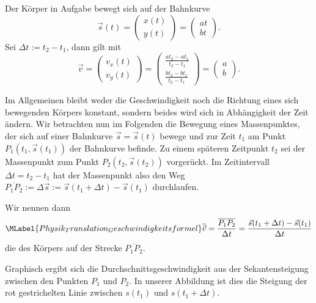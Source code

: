 \begin{MContent}
\begin{MExercise}
 \begin{MSolution} Der K\"orper in Aufgabe  bewegt sich auf der Bahnkurve
 $$
 \vec{s}(t)= \left(\begin{array}{c} x(t) \\ y(t) \end{array}\right)=\left(\begin{array}{c} a t \\ b t \end{array}\right).
 $$Sei $\Delta t:=t_2-t_1$, dann gilt mit 
 $$
 \vec{v}= \left(\begin{array}{c} v_x(t) \\ v_y(t) \end{array}\right)= \left(\begin{array}{c} \frac{a t_2-a t_1}{t_2-t_1} \\ \frac{b t_2-b t_1}{t_2-t_1} \end{array}\right)=\left(\begin{array}{c} a \\ b \end{array}\right).
 $$
 \end{MSolution}
 \end{MExercise}

 
 
 Im Allgemeinen bleibt weder die Geschwindigkeit noch die Richtung eines sich bewegenden K\"orpers konstant, sondern beides wird sich in Abh\"angigkeit der Zeit \"andern. Wir betrachten nun im Folgenden die Bewegung eines Massenpunktes, der sich auf einer Bahnkurve $\vec{s}=\vec{s}(t)$ bewege und zur Zeit $t_1$ am Punkt $P_1(t_1,\vec{s}(t_1))$ der Bahnkurve befinde. Zu einem sp\"ateren Zeitpunkt $t_2$ sei der Massenpunkt zum Punkt $P_2(t_2,\vec{s}(t_2))$ vorger\"uckt. Im Zeitintervall $\Delta t=t_2-t_1$ hat der Massenpunkt also den Weg $\overline{P_1P_2}:=\Delta \vec{s}:=\vec{s}(t_1+\Delta t)-\vec{s}(t_1)$ durchlaufen.
 
 
 
 
 \begin{MInfo}
    Wir nennen dann \begin{equation}\MLabel{Physik_Translation_Geschwindigkeitsformel}
   \overline{\vec{v}}=\frac{\overline{P_1P_2}}{\Delta t}=\frac{\vec{s}(t_1+\Delta t)-\vec{s}(t_1)}{\Delta t}
   \end{equation} die  des K\"orpers auf der Strecke $\overline{P_1P_2}$. 
  \end{MInfo}
  Graphisch ergibt sich die Durchschnittsgeschwindigkeit aus der Sekantensteigung zwischen den Punkten $P_1$ und $P_2$. In unserer Abbildung ist dies die Steigung der rot gestrichelten Linie zwischen $s(t_1)$ und $s(t_1+\Delta t)$.
  

\end{MContent}
